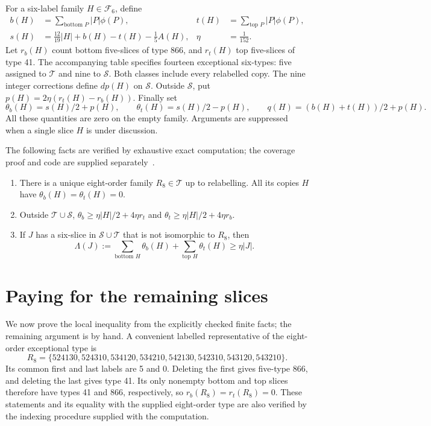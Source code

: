 \documentclass[11pt,letterpaper]{article}
\theoremstyle{definition}
\newcommand{\F}{\mathcal F}
\begin{document}
For a six-label family \(H\in\F_6\), define
\begin{align*}
 b(H)&=\sum_{\text{bottom }P}|P|\phi(P),&
 t(H)&=\sum_{\text{top }P}|P|\phi(P),\\
 s(H)&=\frac{12}{19}|H|+b(H)-t(H)-\frac15A(H),&
 \eta&=\frac1{152}.
\end{align*}
Let \(r_b(H)\) count bottom five-slices of type 866, and
\(r_t(H)\) top five-slices of type 41. The accompanying table
specifies fourteen exceptional six-types: five assigned to \(\mathcal T\)
and nine to \(\mathcal S\). Both classes include every relabelled copy.
The nine integer corrections define \(dp(H)\) on \(\mathcal S\).
Outside \(\mathcal S\), put \(p(H)=2\eta(r_t(H)-r_b(H))\). Finally set
\[
 \theta_b(H)=s(H)/2+p(H),\qquad\theta_t(H)=s(H)/2-p(H),
 \qquad q(H)=(b(H)+t(H))/2+p(H).
\]
All these quantities are zero on the empty family. Arguments are
suppressed when a single slice \(H\) is under discussion.

The following facts are verified by exhaustive exact computation;
the coverage proof and code are supplied separately~\cite{LeanRepository}.
\begin{enumerate}[label=F\arabic*.]
\item There is a unique eight-order family \(R_8\in\mathcal T\)
      up to relabelling. All its copies \(H\) have
      \(\theta_b(H)=\theta_t(H)=0\).
\item Outside \(\mathcal T\cup\mathcal S\),
 \(\theta_b\geq\eta|H|/2+4\eta r_t\) and
 \(\theta_t\geq\eta|H|/2+4\eta r_b\).
\item If \(J\) has a six-slice in \(\mathcal S\cup\mathcal T\)
 that is not isomorphic to \(R_8\), then
\[
 \Lambda(J):=\sum_{\text{bottom }H}\theta_b(H)+
             \sum_{\text{top }H}\theta_t(H)\geq\eta|J|.
\]
\end{enumerate}

\clearpage
\section{Paying for the remaining slices}\label{sec:receiver}
We now prove the local inequality from the explicitly checked finite
facts; the remaining argument is by hand. A convenient labelled
representative of the eight-order exceptional type is
\[
 R_8=\{524130,524310,534120,534210,
       542130,542310,543120,543210\}.
\]
Its common first and last labels are 5 and 0. Deleting the first
gives five-type 866, and deleting the last gives type 41.
Its only nonempty bottom and top slices therefore have types 41 and
866, respectively, so \(r_b(R_8)=r_t(R_8)=0\).
These statements and its equality with the supplied eight-order type
are also verified by the indexing procedure supplied with the computation.
\end{document}
